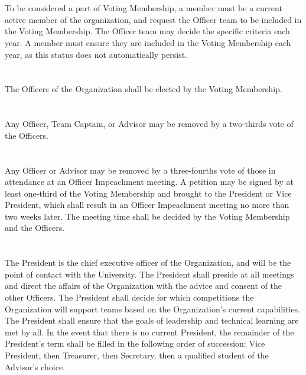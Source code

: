 \documentclass[12pt]{cls/constitution}
\begin{document}
\section{}
To be considered a part of Voting Membership, a member must be a current active member of the organization, and request the Officer team to be included in the Voting Membership. The Officer team may decide the specific criteria each year. A member must ensure they are included in the Voting Membership each year, as this status does not automatically persist.

\section{}
The Officers of the Organization shall be elected by the Voting Membership.

\section{}
Any Officer, Team Captain, or Advisor may be removed by a two-thirds vote of the Officers.

\section{}
Any Officer or Advisor may be removed by a three-fourths vote of those in attendance at an Officer Impeachment meeting. A petition may be signed by at least one-third of the Voting Membership and brought to the President or Vice President, which shall result in an Officer Impeachment meeting no more than two weeks later. The meeting time shall be decided by the Voting Membership and the Officers.

\section{}
The President is the chief executive officer of the Organization, and will be the point of contact with the University. The President shall preside at all meetings and direct the affairs of the Organization with the advice and consent of the other Officers. The President shall decide for which competitions the Organization will support teams based on the Organization's current capabilities. The President shall ensure that the goals of leadership and technical learning are met by all. In the event that there is no current President, the remainder of the President’s term shall be filled in the following order of succession:  Vice President, then Treasurer, then Secretary, then a qualified student of the Advisor’s choice.
\end{document}
